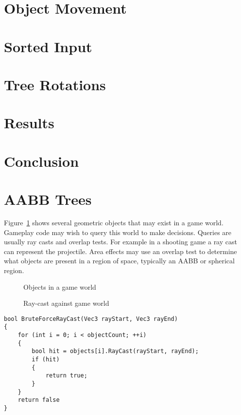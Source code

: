 \documentclass{article}
\begin{document}
\section{Object Movement}

\section{Sorted Input}

\section{Tree Rotations}

\section{Results}

\section{Conclusion}


\section{AABB Trees}
Figure~\ref{fig:loose} shows several geometric objects that may exist in a game world. Gameplay code may wish to query this world to make decisions. Queries are usually ray casts and overlap tests. For example in a shooting game a ray cast can represent the projectile. Area effects may use an overlap test to determine what objects are present in a region of space, typically an AABB or spherical region.

\begin{figure}
	\begin{center}
		
	\end{center}
	\caption{Objects in a game world}
	\label{fig:loose}
\end{figure}

\begin{figure}
	\begin{center}
		
	\end{center}
	\caption{Ray-cast against game world}
	\label{fig:raycast}
\end{figure}

\begin{lstlisting}[caption={Brute-force ray-casting}, label={lst:brute_ray}, float]
bool BruteForceRayCast(Vec3 rayStart, Vec3 rayEnd)
{
	for (int i = 0; i < objectCount; ++i)
	{
		bool hit = objects[i].RayCast(rayStart, rayEnd);
		if (hit)
		{
			return true;
		}
	}
	return false
}
\end{lstlisting}
\end{document}
